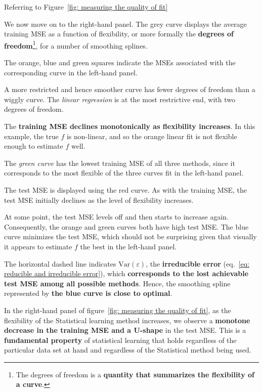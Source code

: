 \documentclass[a4paper]{article}
\newcommand{\definition}[1]{\textcolor{Red3}{\textbf{#1}}\index{#1}}
\newcommand{\Var}{\mathrm{Var}}
\newcommand{\highspace}{\vspace{1.2em}\noindent}
\begin{document}
    \begin{examplebox}
        \begin{center}
            Referring to Figure~\ref{fig: measuring the quality of fit}
        \end{center}

        We now move on to the right-hand panel. The grey curve displays the average training MSE as a function of flexibility, or more formally the \definition{degrees of freedom}\footnote{The degrees of freedom is a \textbf{quantity that summarizes the flexibility of a curve}.}, for a number of smoothing splines.

        The orange, blue and green squares indicate the MSEs associated with the corresponding curve in the left-hand panel.

        A more restricted and hence smoother curve has fewer degrees of freedom than a wiggly curve. The \emph{linear regression} is at the most restrictive end, with two degrees of freedom.

        \highspace
        The \textbf{training MSE declines monotonically as flexibility increases}. In this example, the true $f$ is non-linear, and so the orange linear fit is not flexible enough to estimate $f$ well. 
        
        The \emph{green curve} has the lowest training MSE of all three methods, since it corresponds to the most flexible of the three curves fit in the left-hand panel.

        \highspace
        The test MSE is displayed using the red curve. As with the training MSE, the test MSE initially declines as the level of flexibility increases.

        At some point, the test MSE levels off and then starts to increase again. Consequently, the orange and green curves both have high test MSE. The blue curve minimizes the test MSE, which should not be surprising given that visually it appears to estimate $f$ the best in the left-hand panel.

        The horizontal dashed line indicates $\Var\left(\varepsilon\right)$, the \textbf{irreducible error} (eq.~\ref{eq: reducible and irreducible error}), which \textbf{corresponds to the lost achievable test MSE among all possible methods}. Hence, the smoothing spline represented by \textbf{the blue curve is close to optimal}.
    \end{examplebox}

    In the right-hand panel of figure~\ref{fig: measuring the quality of fit}, as the flexibility of the Statistical learning method increases, we observe a \textbf{monotone decrease in the training MSE and a U-shape} in the test MSE. This is a \textbf{fundamental property} of statistical learning that holds regardless of the particular data set at hand and regardless of the Statistical method being used.
    
\end{document}
